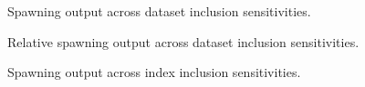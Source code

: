 \documentclass[
]{scrartcl}
\begin{document}
\begin{figure}


\caption{\label{fig-sens_data_spout}Spawning output across dataset
inclusion sensitivities.}

\end{figure}%

\begin{figure}


\caption{\label{fig-sens_data_status}Relative spawning output across
dataset inclusion sensitivities.}

\end{figure}%

\begin{figure}


\caption{\label{fig-sens_indices_spout}Spawning output across index
inclusion sensitivities.}

\end{figure}%
\end{document}
